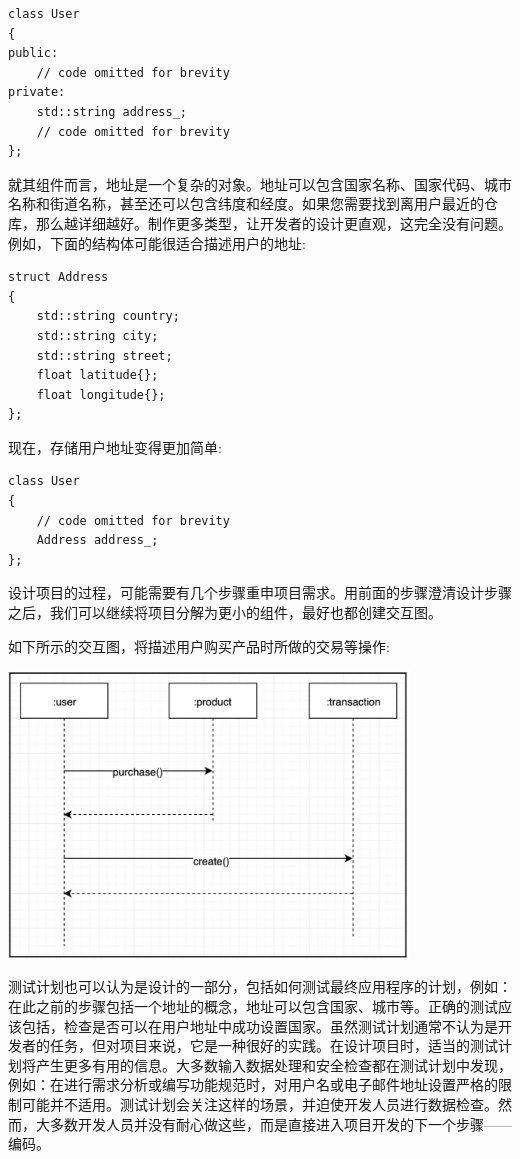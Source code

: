 \begin{lstlisting}[caption={}]
class User
{
public:
	// code omitted for brevity
private:
	std::string address_;
	// code omitted for brevity
};
\end{lstlisting}

就其组件而言，地址是一个复杂的对象。地址可以包含国家名称、国家代码、城市名称和街道名称，甚至还可以包含纬度和经度。如果您需要找到离用户最近的仓库，那么越详细越好。制作更多类型，让开发者的设计更直观，这完全没有问题。例如，下面的结构体可能很适合描述用户的地址: \par

\begin{lstlisting}[caption={}]
struct Address
{
	std::string country;
	std::string city;
	std::string street;
	float latitude{};
	float longitude{};
};
\end{lstlisting}

现在，存储用户地址变得更加简单: \par

\begin{lstlisting}[caption={}]
class User
{
	// code omitted for brevity
	Address address_;
};
\end{lstlisting}

设计项目的过程，可能需要有几个步骤重申项目需求。用前面的步骤澄清设计步骤之后，我们可以继续将项目分解为更小的组件，最好也都创建交互图。 \par
如下所示的交互图，将描述用户购买产品时所做的交易等操作: \par

\begin{center}
	\includegraphics[width=0.8\textwidth]{content/Section-2/Chapter-10/3}
\end{center}

测试计划也可以认为是设计的一部分，包括如何测试最终应用程序的计划，例如：在此之前的步骤包括一个地址的概念，地址可以包含国家、城市等。正确的测试应该包括，检查是否可以在用户地址中成功设置国家。虽然测试计划通常不认为是开发者的任务，但对项目来说，它是一种很好的实践。在设计项目时，适当的测试计划将产生更多有用的信息。大多数输入数据处理和安全检查都在测试计划中发现，例如：在进行需求分析或编写功能规范时，对用户名或电子邮件地址设置严格的限制可能并不适用。测试计划会关注这样的场景，并迫使开发人员进行数据检查。然而，大多数开发人员并没有耐心做这些，而是直接进入项目开发的下一个步骤——编码。 \par

